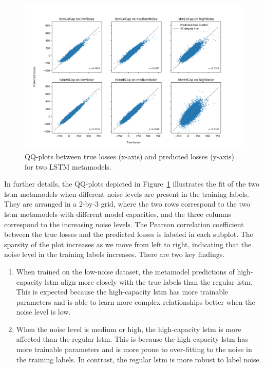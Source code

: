 \begin{figure}[ht!]
    \centering
    \includegraphics[width=\textwidth]{./project2/figures/qqPlots/lstmAll.png}
    \caption{QQ-plots between true losses (x-axis) and predicted losses (y-axis) for two LSTM metamodels.} 
    \label{fig2:QQ_All}
\end{figure}

In further details, the QQ-plots depicted in Figure~\ref{fig2:QQ_All} illustrates the fit of the two \gls{lstm} metamodels when different noise levels are present in the training labels.
They are arranged in a 2-by-3 grid, where the two rows correspond to the two \gls{lstm} metamodels with different model capacities, and the three columns correspond to the increasing noise levels.
The Pearson correlation coefficient between the true losses and the predicted losses is labeled in each subplot.
The sparsity of the plot increases as we move from left to right, indicating that the noise level in the training labels increases.
There are two key findings.
\begin{enumerate}
    \item   When trained on the low-noise dataset, the metamodel predictions of high-capacity \gls{lstm} align more closely with the true labels than the regular \gls{lstm}.
    This is expected because the high-capacity \gls{lstm} has more trainable parameters and is able to learn more complex relationships better when the noise level is low.
    \item   When the noise level is medium or high, the high-capacity \gls{lstm} is more affected than the regular \gls{lstm}.
    This is because the high-capacity \gls{lstm} has more trainable parameters and is more prone to over-fitting to the noise in the training labels.
    In contrast, the regular \gls{lstm} is more robust to label noise.
\end{enumerate}

